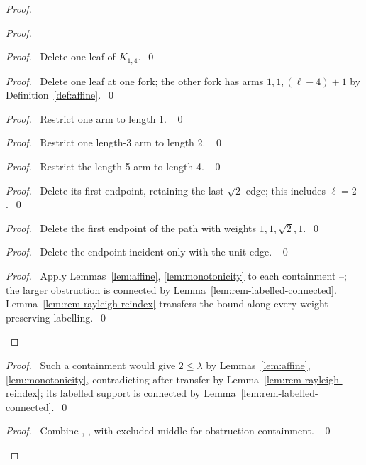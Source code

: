 \begin{proof}
\begin{proof}
\begin{proof}\pf\ Delete one leaf of $K_{1,4}$.~\qed\end{proof}
\begin{proof}\pf\ Delete one leaf at one fork; the other fork has arms
$1,1,(\ell-4)+1$ by Definition~\ref{def:affine}.~\qed\end{proof}
\begin{proof}\pf\ Restrict one arm to length 1. ~\qed\end{proof}
\begin{proof}\pf\ Restrict one length-3 arm to length 2. ~\qed\end{proof}
\begin{proof}\pf\ Restrict the length-5 arm to length 4. ~\qed\end{proof}
\begin{proof}\pf\ Delete its first endpoint, retaining the last
$\sqrt2$ edge; this includes $\ell=2$.~\qed\end{proof}
\begin{proof}\pf\ Delete the first endpoint of the path with weights
$1,1,\sqrt2,1$.~\qed\end{proof}
\begin{proof}\pf\ Delete the endpoint incident only with the unit edge. ~\qed\end{proof}
\qedstep
\begin{proof}\pf\ Apply Lemmas~\ref{lem:affine}, \ref{lem:monotonicity}
to each containment --;
the larger obstruction is connected by Lemma~\ref{lem:rem-labelled-connected}.
Lemma~\ref{lem:rem-rayleigh-reindex} transfers the bound along every
weight-preserving labelling.~\qed\end{proof}
\end{proof}
\begin{proof}\pf\ Such a containment would give $2\leq\lambda$ by
Lemmas~\ref{lem:affine}, \ref{lem:monotonicity}, contradicting
 after transfer by Lemma~\ref{lem:rem-rayleigh-reindex};
its labelled support is connected by Lemma~\ref{lem:rem-labelled-connected}.~\qed\end{proof}
\qedstep
\begin{proof}\pf\ Combine , ,
 with excluded middle for obstruction containment. ~\qed\end{proof}
\end{proof}

